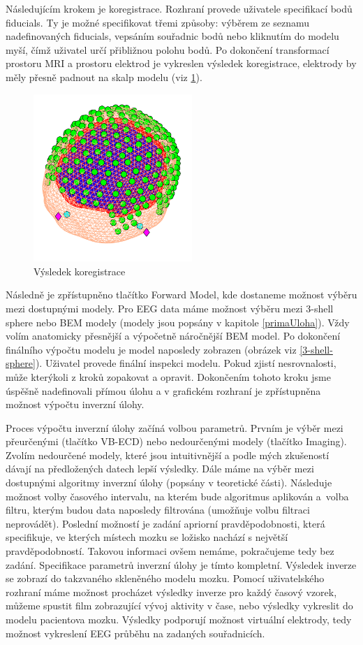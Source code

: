 Následujícím krokem je koregistrace. Rozhraní provede uživatele specifikací bodů fiducials. Ty je možné specifikovat třemi způsoby: výběrem ze seznamu nadefinovaných fiducials, vepsáním souřadnic bodů nebo kliknutím do modelu myší, čímž uživatel určí přibližnou polohu bodů. Po dokončení transformací prostoru MRI a prostoru elektrod je vykreslen výsledek koregistrace, elektrody by měly přesně padnout na skalp modelu (viz \ref{prikladKoregistrace}).

\begin{figure}[!h]
\includegraphics[width = 6cm]{casti/implementace/sourceReconstruction/Corregistration.png}
\caption{Výsledek koregistrace}
\label{prikladKoregistrace}
\end{figure}

Následně je zpřístupněno tlačítko Forward Model, kde dostaneme možnost výběru mezi dostupnými modely. Pro EEG data máme možnost výběru mezi 3-shell sphere nebo BEM modely (modely jsou popsány v kapitole \ref{primaUloha}). Vždy volím anatomicky přesnější a výpočetně náročnější BEM model. Po dokončení finálního výpočtu modelu je model naposledy zobrazen (obrázek viz \ref{3-shell-sphere}). Uživatel provede finální inspekci modelu. Pokud zjistí nesrovnalosti, může kterýkoli z kroků zopakovat a opravit. Dokončením tohoto kroku jsme úspěšně nadefinovali přímou úlohu a v grafickém rozhraní je zpřístupněna možnost výpočtu inverzní úlohy.

Proces výpočtu inverzní úlohy začíná volbou parametrů. Prvním je výběr mezi přeurčenými (tlačítko VB-ECD) nebo nedourčenými modely (tlačítko Imaging). Zvolím nedourčené modely, které jsou intuitivnější a podle mých zkušeností dávají na předložených datech lepší výsledky. Dále máme na výběr mezi dostupnými algoritmy inverzní úlohy (popsány v teoretické části). Následuje možnost volby časového intervalu, na kterém bude algoritmus aplikován a~volba filtru, kterým budou data naposledy filtrována (umožňuje volbu filtraci neprovádět). Poslední možností je zadání apriorní pravděpodobnosti, která specifikuje, ve kterých místech mozku se ložisko nachází s největší pravděpodobností. Takovou informaci ovšem nemáme, pokračujeme tedy bez zadání. Specifikace parametrů inverzní úlohy je tímto kompletní. Výsledek inverze se zobrazí do takzvaného skleněného modelu mozku. Pomocí uživatelského rozhraní máme možnost procházet výsledky inverze pro každý časový vzorek, můžeme spustit film zobrazující vývoj aktivity v čase, nebo výsledky vykreslit do modelu pacientova mozku. Výsledky podporují možnost virtuální elektrody, tedy možnost vykreslení EEG průběhu na zadaných souřadnicích.

